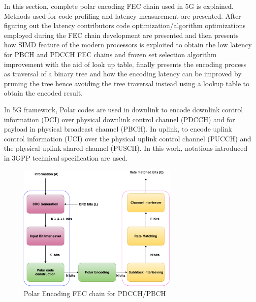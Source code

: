 In this section, complete polar encoding FEC chain used in 5G is explained. Methods used for code profiling and latency measurement are presented. After figuring out the latency contributors code optimization/algorithm optimizations employed during the FEC chain development are presented and then presents how SIMD feature of the modern processors is exploited to obtain the low latency for PBCH and PDCCH FEC chains and frozen set selection algorithm improvement with the aid of look up table, finally presents the encoding process as traversal of a binary tree and how the encoding latency can be improved by pruning the tree hence avoiding the tree traversal instead using a lookup table to obtain the encoded result.

In 5G framework, Polar codes are used in downlink to encode downlink control information (DCI) over physical downlink control channel (PDCCH) and for payload in physical broadcast channel (PBCH). In uplink, to encode uplink control information (UCI) over the physical uplink control channel (PUCCH) and the physical uplink shared channel (PUSCH). In this work, notations introduced in 3GPP technical specification\cite{3gpp.38.212} are used.

\begin{figure}[h]
	\centering
	\includegraphics[width=0.7\textwidth]{./figures/5GFECChain.pdf}
	\caption{Polar Encoding FEC chain for PDCCH/PBCH}
	\label{fig:5g_fec_chain}
\end{figure}

